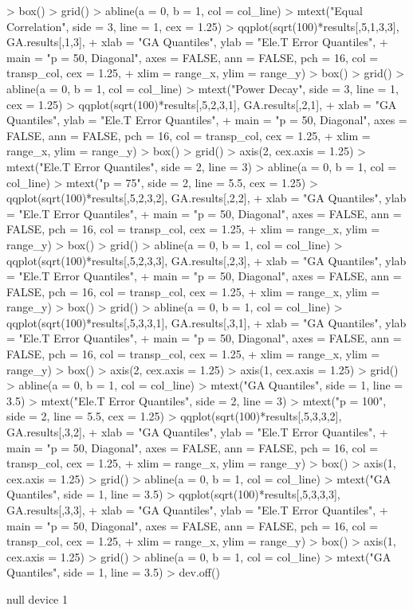 \documentclass{article}
\begin{document}
\begin{Schunk}
\begin{Sinput}
> box()
> grid()
> abline(a = 0, b = 1, col = col_line)
> mtext("Equal Correlation", side = 3, line = 1, cex = 1.25)
> qqplot(sqrt(100)*results[,5,1,3,3], GA.results[,1,3],
+        xlab = "GA Quantiles", ylab = "Ele.T Error Quantiles",
+        main = "p = 50, Diagonal", axes = FALSE, ann = FALSE, pch = 16, col = transp_col, cex = 1.25,
+        xlim = range_x, ylim = range_y)
> box()
> grid()
> abline(a = 0, b = 1, col = col_line)
> mtext("Power Decay", side = 3, line = 1, cex = 1.25)
> qqplot(sqrt(100)*results[,5,2,3,1], GA.results[,2,1],
+        xlab = "GA Quantiles", ylab = "Ele.T Error Quantiles",
+        main = "p = 50, Diagonal", axes = FALSE, ann = FALSE, pch = 16, col = transp_col, cex = 1.25,
+        xlim = range_x, ylim = range_y)
> box()
> grid()
> axis(2, cex.axis = 1.25)
> mtext("Ele.T Error Quantiles", side = 2, line = 3)
> abline(a = 0, b = 1, col = col_line)
> mtext("p = 75", side = 2, line = 5.5, cex = 1.25)
> qqplot(sqrt(100)*results[,5,2,3,2], GA.results[,2,2],
+        xlab = "GA Quantiles", ylab = "Ele.T Error Quantiles",
+        main = "p = 50, Diagonal", axes = FALSE, ann = FALSE, pch = 16, col = transp_col, cex = 1.25,
+        xlim = range_x, ylim = range_y)
> box()
> grid()
> abline(a = 0, b = 1, col = col_line)
> qqplot(sqrt(100)*results[,5,2,3,3], GA.results[,2,3],
+        xlab = "GA Quantiles", ylab = "Ele.T Error Quantiles",
+        main = "p = 50, Diagonal", axes = FALSE, ann = FALSE, pch = 16, col = transp_col, cex = 1.25,
+        xlim = range_x, ylim = range_y)
> box()
> grid()
> abline(a = 0, b = 1, col = col_line)
> qqplot(sqrt(100)*results[,5,3,3,1], GA.results[,3,1],
+        xlab = "GA Quantiles", ylab = "Ele.T Error Quantiles",
+        main = "p = 50, Diagonal", axes = FALSE, ann = FALSE, pch = 16, col = transp_col, cex = 1.25,
+        xlim = range_x, ylim = range_y)
> box()
> axis(2, cex.axis = 1.25)
> axis(1, cex.axis = 1.25)
> grid()
> abline(a = 0, b = 1, col = col_line)
> mtext("GA Quantiles", side = 1, line = 3.5)
> mtext("Ele.T Error Quantiles", side = 2, line = 3)
> mtext("p = 100", side = 2, line = 5.5, cex = 1.25)
> qqplot(sqrt(100)*results[,5,3,3,2], GA.results[,3,2],
+        xlab = "GA Quantiles", ylab = "Ele.T Error Quantiles",
+        main = "p = 50, Diagonal", axes = FALSE, ann = FALSE, pch = 16, col = transp_col, cex = 1.25,
+        xlim = range_x, ylim = range_y)
> box()
> axis(1, cex.axis = 1.25)
> grid()
> abline(a = 0, b = 1, col = col_line)
> mtext("GA Quantiles", side = 1, line = 3.5)
> qqplot(sqrt(100)*results[,5,3,3,3], GA.results[,3,3],
+        xlab = "GA Quantiles", ylab = "Ele.T Error Quantiles",
+        main = "p = 50, Diagonal", axes = FALSE, ann = FALSE, pch = 16, col = transp_col, cex = 1.25,
+        xlim = range_x, ylim = range_y)
> box()
> axis(1, cex.axis = 1.25)
> grid()
> abline(a = 0, b = 1, col = col_line)
> mtext("GA Quantiles", side = 1, line = 3.5)
> dev.off()
\end{Sinput}
\begin{Soutput}
null device 
          1 
\end{Soutput}
\end{Schunk}

\begin{figure}

\end{figure}
\end{document}
